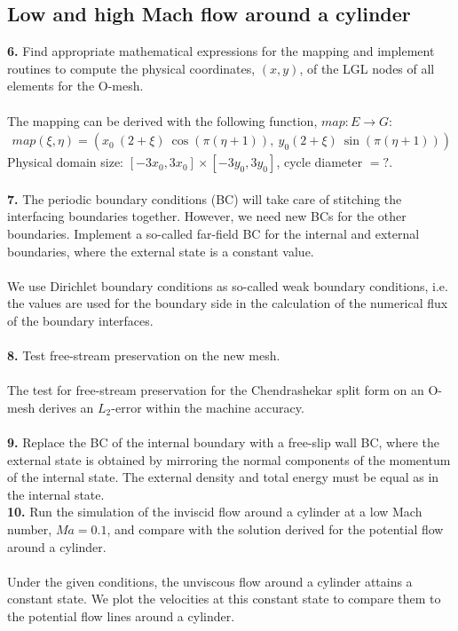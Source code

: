 \documentclass[11pt]{scrartcl}
\begin{document}
\subsection{Low and high Mach flow around a cylinder}
\textbf{6.} Find appropriate mathematical expressions for the mapping and implement routines to compute the physical coordinates, $(x,y)$, of the LGL nodes of all elements for the O-mesh.\\ \ \\
The mapping can be derived with the following function, $map: E \rightarrow G$:
\begin{align*}
map(\xi, \eta) = \left( x_0 \ (2 + \xi )\  \cos(\pi (\eta + 1)), \ y_0 (2 + \xi ) \ \sin(\pi (\eta + 1)) \right)
\end{align*}
Physical domain size: $[-3x_0, 3x_0] \times [-3y_0, 3y_0] $, cycle diameter $= ?$.\\ \ \\
\textbf{7.} The periodic boundary conditions (BC) will take care of stitching the interfacing boundaries together. However, we need new BCs for the other boundaries. Implement a so-called far-field BC for the internal and external boundaries, where the external state is a constant value. \\ \ \\
We use Dirichlet boundary conditions as so-called weak boundary conditions, i.e. the values are used for the boundary side in the calculation of the numerical flux of the boundary interfaces. \\ \ \\
\textbf{8.} Test free-stream preservation on the new mesh.\\ \ \\
The test for free-stream preservation for the Chendrashekar split form on an O-mesh derives an $L_2$-error within the machine accuracy. \\ \ \\
\textbf{9.} Replace the BC of the internal boundary with a free-slip wall BC, where the external state is obtained by mirroring the normal components of the momentum of the internal state. The external density and total energy must be equal as in the internal state. \\
\textbf{10.} Run the simulation of the inviscid flow around a cylinder at a low Mach number, $Ma=0.1$, and compare with the solution derived for the potential flow around a cylinder. \\ \ \\
Under the given conditions, the unviscous flow around a cylinder attains a constant state. We plot the velocities at this constant state to compare them to the potential flow lines around a cylinder.
\end{document}
